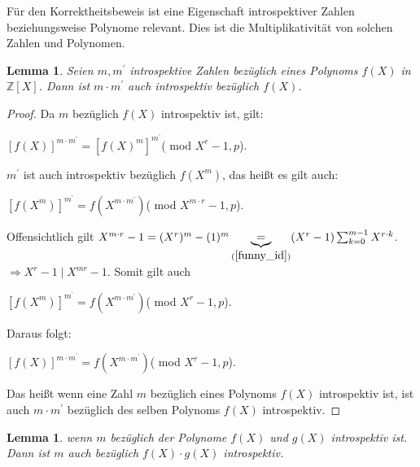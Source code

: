 \documentclass[12pt,oneside]{article}
\newtheorem{lemma}[theorem]{Lemma}
\theoremstyle{remark}
\theoremstyle{definition}
\begin{document}
Für den Korrektheitsbeweis ist eine Eigenschaft introspektiver Zahlen beziehungsweise Polynome relevant. Dies ist die Multiplikativität von solchen Zahlen und Polynomen.

\smallskip

\begin{lemma}\label{intros_num}
Seien $m,m^{'}$ introspektive Zahlen bezüglich eines Polynoms $f(X)$ in $\mathbb{Z}[X]$. Dann ist $m \cdot m^{'}$ auch introspektiv bezüglich $f(X)$.
\end{lemma}

\begin{proof}
Da $m$ bezüglich $f(X)$ introspektiv ist, gilt:\newline\newline
\centerline{$[f(X)]^{m \cdot m^{'}} = [f(X)^{m}]^{m^{'}}$( mod $X^r - 1, p$).}\newline\newline
$m^{'}$ ist auch introspektiv bezüglich $f(X^{m})$, das heißt es gilt auch:\newline\newline
\centerline{$[f(X^m)]^{m^{'}} = f(X^{m \cdot m^{'}})$( mod $X^{m\cdot r} - 1, p$).}\newline\newline

Offensichtlich gilt $X^{m \cdot r } - 1 = (X^{r})^{m} - (1)^m \underbrace{=}_{(\ref{funny_id})} (X^{r} - 1) \sum_{k = 0}^{m-1} X^{r \cdot k}$.\newline\newline$\Rightarrow X^{r} - 1\mid X^{mr} - 1$. Somit gilt auch\newline\newline
\centerline{$[f(X^m)]^{m^{'}} = f(X^{m \cdot m^{'}})$( mod $X^{r} - 1,p$).}\newline

Daraus folgt:\newline\newline
\centerline{$[f(X)]^{m \cdot m^{'}} = f(X^{m \cdot m^{'}}) $( mod $X^r - 1, p$).}\newline

Das heißt wenn eine Zahl $m$ bezüglich eines Polynoms $f(X)$ introspektiv ist, ist auch $m \cdot m^{'}$ bezüglich des selben Polynoms $f(X)$ introspektiv. 
\end{proof}

\smallskip

\begin{lemma}
wenn $m$ bezüglich der Polynome $f(X)$ und $g(X)$ introspektiv ist. Dann ist $m$ auch bezüglich $f(X) \cdot g(X)$ introspektiv.  
\end{lemma}
\end{document}
